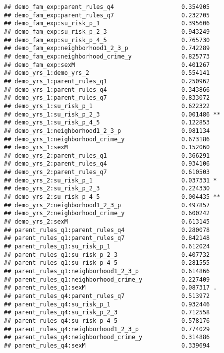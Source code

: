 \documentclass[
]{article}
\begin{document}
\begin{verbatim}
## demo_fam_exp:parent_rules_q4                   0.354905    
## demo_fam_exp:parent_rules_q7                   0.232705    
## demo_fam_exp:su_risk_p_1                       0.395606    
## demo_fam_exp:su_risk_p_2_3                     0.943249    
## demo_fam_exp:su_risk_p_4_5                     0.765730    
## demo_fam_exp:neighborhood1_2_3_p               0.742289    
## demo_fam_exp:neighborhood_crime_y              0.825773    
## demo_fam_exp:sexM                              0.401267    
## demo_yrs_1:demo_yrs_2                          0.554141    
## demo_yrs_1:parent_rules_q1                     0.250962    
## demo_yrs_1:parent_rules_q4                     0.343866    
## demo_yrs_1:parent_rules_q7                     0.833072    
## demo_yrs_1:su_risk_p_1                         0.622322    
## demo_yrs_1:su_risk_p_2_3                       0.001486 ** 
## demo_yrs_1:su_risk_p_4_5                       0.122853    
## demo_yrs_1:neighborhood1_2_3_p                 0.981134    
## demo_yrs_1:neighborhood_crime_y                0.673186    
## demo_yrs_1:sexM                                0.152060    
## demo_yrs_2:parent_rules_q1                     0.366291    
## demo_yrs_2:parent_rules_q4                     0.934106    
## demo_yrs_2:parent_rules_q7                     0.610503    
## demo_yrs_2:su_risk_p_1                         0.037331 *  
## demo_yrs_2:su_risk_p_2_3                       0.224330    
## demo_yrs_2:su_risk_p_4_5                       0.004435 ** 
## demo_yrs_2:neighborhood1_2_3_p                 0.497857    
## demo_yrs_2:neighborhood_crime_y                0.600242    
## demo_yrs_2:sexM                                0.613145    
## parent_rules_q1:parent_rules_q4                0.280078    
## parent_rules_q1:parent_rules_q7                0.842148    
## parent_rules_q1:su_risk_p_1                    0.612024    
## parent_rules_q1:su_risk_p_2_3                  0.407732    
## parent_rules_q1:su_risk_p_4_5                  0.281555    
## parent_rules_q1:neighborhood1_2_3_p            0.614866    
## parent_rules_q1:neighborhood_crime_y           0.227409    
## parent_rules_q1:sexM                           0.087317 .  
## parent_rules_q4:parent_rules_q7                0.513972    
## parent_rules_q4:su_risk_p_1                    0.932446    
## parent_rules_q4:su_risk_p_2_3                  0.712558    
## parent_rules_q4:su_risk_p_4_5                  0.578176    
## parent_rules_q4:neighborhood1_2_3_p            0.774029    
## parent_rules_q4:neighborhood_crime_y           0.314886    
## parent_rules_q4:sexM                           0.339694    

\end{verbatim}
\end{document}

